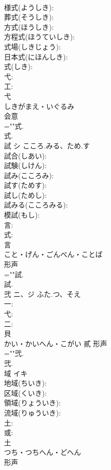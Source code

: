 \documentclass[8pt]{extreport}
\begin{document}
\begin{CJK}{UTF8}{min}
\\	様式(ようしき): 
\\	葬式(そうしき): 
\\	方式(ほうしき): 
\\	方程式(ほうていしき): 
\\	式場(しきじょう): 
\\	日本式(にほんしき): 
\\	式(しき): 
\\	弋: 
\\	工: 
\\	弋	
\\	しきがまえ・いぐるみ	
\\	会意 
\\	=""式.
\\	式.
\\	試	シ	こころ.みる、ため.す		
\\	試合(しあい): 
\\	試験(しけん): 
\\	試み(こころみ): 
\\	試す(ためす): 
\\	試し(ためし): 
\\	試みる(こころみる): 
\\	模試(もし): 
\\	言: 
\\	式: 
\\	言	
\\	こと・げん・ごんべん・ことば	
\\	形声 
\\	=""試.
\\	試.
\\	弐	ニ、ジ	ふた.つ、そえ		
\\	一: 
\\	弋: 
\\	二: 
\\	貝	
\\	かい・かいへん・こがい	貳	形声 
\\	=""弐.
\\	弐.
\\	域	イキ			
\\	地域(ちいき): 
\\	区域(くいき): 
\\	領域(りょういき): 
\\	流域(りゅういき): 
\\	土: 
\\	或: 
\\	土	
\\	つち・つちへん・どへん	
\\	形声 

\end{CJK}
\end{document}
